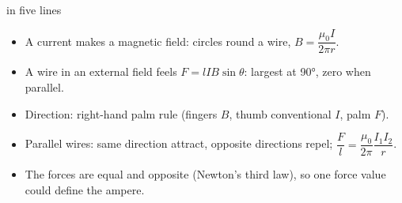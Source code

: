 \begin{summarybox}{ in five lines}
\begin{itemize}
  \item A current makes a magnetic field: circles round a wire, $B = \dfrac{\mu_0 I}{2\pi r}$.
  \item A wire in an external field feels $F = lIB\sin\theta$: largest at \ang{90}, zero when
        parallel.
  \item Direction: right-hand palm rule (fingers $B$, thumb conventional $I$, palm $F$).
  \item Parallel wires: same direction attract, opposite directions repel;
        $\dfrac{F}{l} = \dfrac{\mu_0}{2\pi}\dfrac{I_1 I_2}{r}$.
  \item The forces are equal and opposite (Newton's third law), so one force value could define
        the ampere.
\end{itemize}
\end{summarybox}
